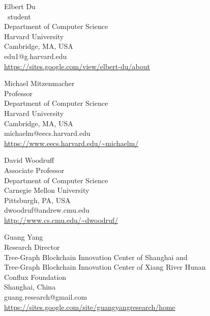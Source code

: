 \documentclass{toc}
\begin{document}
%
%
%
%
%
\begin{tocauthors}
\begin{tocinfo}[du]
 Elbert Du\\
 \phd\ student\\
 Department of Computer Science\\
 Harvard University\\
 Cambridge, MA, USA\\
 edu1@g.harvard.edu \\   %
 \url{https://sites.google.com/view/elbert-du/about}
\end{tocinfo}
\begin{tocinfo}[mitzenmacher]
 Michael Mitzenmacher\\
 Professor\\
 Department of Computer Science\\
 Harvard University\\
 Cambridge, MA, USA\\
 michaelm@eecs.harvard.edu \\   %
 \url{https://www.eecs.harvard.edu/~michaelm/}      %
\end{tocinfo}
\begin{tocinfo}[woodruff]
 David Woodruff\\
 Associate Professor\\
 Department of Computer Science\\
 Carnegie Mellon University\\
 Pittsburgh, PA, USA\\
 dwoodruf@andrew.cmu.edu \\   %
 \url{http://www.cs.cmu.edu/~dwoodruf/}      %
\end{tocinfo}
\begin{tocinfo}[yang]
 Guang Yang\\
 Research Director\\
 Tree-Graph Blockchain Innovation Center of Shanghai and\\
 Tree-Graph Blockchain Innovation Center of Xiang River Hunan\\
 Conflux Foundation\\
 Shanghai, China\\
 guang.research@gmail.com \\
 \url{https://sites.google.com/site/guangyangresearch/home}
\end{tocinfo}
\end{tocauthors}
\end{document}
